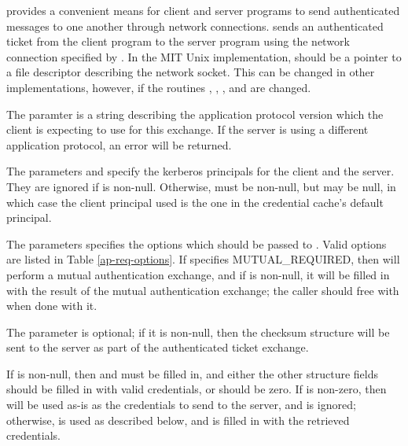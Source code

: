  provides a convenient means for client and
server programs to send authenticated messages to one another through
network connections.   sends an authenticated
ticket from the client program to the server program using the network
connection specified by .  In the MIT Unix implementation,
 should be a pointer to a file descriptor describing the
network socket.  This can be changed in other implementations, however,
if the routines ,
, , and
 are changed.

The paramter  is a string describing the
application protocol version which the client is expecting to use for
this exchange.  If the server is using a different application protocol,
an error will be returned.

The parameters  and  specify the
kerberos principals for the client and the server.  They are
ignored if  is non-null.  Otherwise,
 must be non-null, but  may be
null, in which case the client principal used is the one in the
credential cache's default principal.

The  parameters specifies the options which
should be passed to .  Valid options are listed
in Table \ref{ap-req-options}.  If 
specifies MUTUAL_REQUIRED, then  will perform
a mutual authentication exchange, and if  is
non-null, it will be filled in with the result of the mutual
authentication exchange; the caller should free
 with
 when done with it.

The  parameter is optional; if it is non-null,
then the checksum structure will be sent to the server as part of the
authenticated ticket exchange.

If  is non-null, then  and
 must be filled in, and either
the other structure fields should be filled in with valid credentials,
or  should be zero.  If
 is non-zero, then
 will be used as-is as the credentials to send to
the server, and  is ignored; otherwise,
 is used as described below, and 
is filled in with the retrieved credentials.

